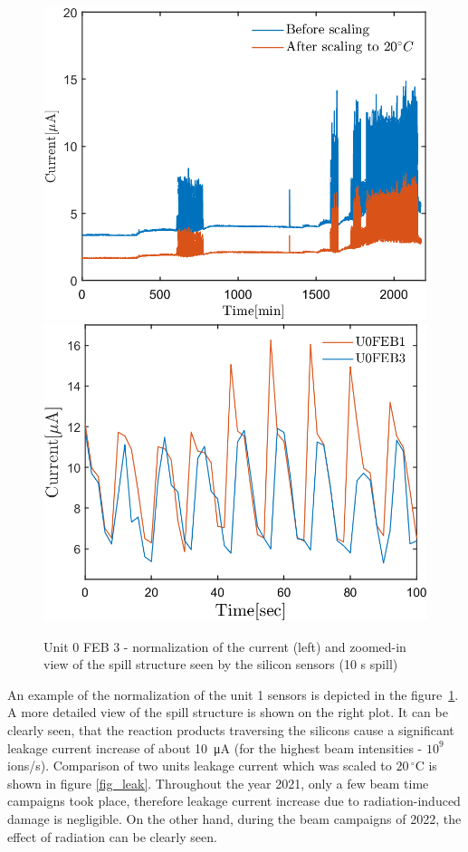 \begin{figure}[!h]
\centering
\includegraphics[width=0.45\columnwidth]{Chapter5/DCS/images/uranium/current_U_highintensity.png}
\includegraphics[width=0.47\columnwidth]{Chapter5/DCS/images/uranium/U3L1_spill.png}
\caption{Unit 0 \gls{FEB} 3 - normalization of the current (left) and zoomed-in view of the spill structure seen by the silicon sensors (10 s spill)}
\label{fig_sensors_spill}
\end{figure}

An example of the normalization of the unit 1 sensors is depicted in the figure~\ref{fig_sensors_spill}. A more detailed view of the spill structure is shown on the right plot. It can be clearly seen, that the reaction products traversing the silicons cause a significant leakage current increase of about \SI{10}{\micro A} (for the highest beam intensities - $10^{9}$ ions/s). Comparison of two units leakage current which was scaled to $20\,^{\circ}$C is shown in figure \ref{fig_leak}. Throughout the year 2021, only a few beam time campaigns took place, therefore leakage current increase due to radiation-induced damage is negligible. On the other hand, during the beam campaigns of 2022, the effect of radiation can be clearly seen.


